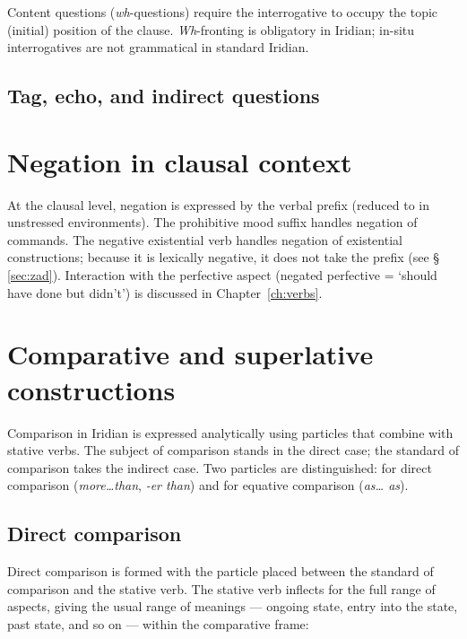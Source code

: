 Content questions (\textit{wh}-questions) require the interrogative to occupy the topic (initial) position of the clause. \textit{Wh}-fronting is obligatory in Iridian; in-situ interrogatives are not grammatical in standard Iridian.


\subsection{Tag, echo, and indirect questions}


\section{Negation in clausal context}\label{sec:clausal-negation}

At the clausal level, negation is expressed by the verbal prefix  (reduced to  in unstressed environments). The prohibitive mood suffix  handles negation of commands. The negative existential verb  handles negation of existential constructions; because it is lexically negative, it does not take the prefix  (see §\,\ref{sec:zad}). Interaction with the perfective aspect (negated perfective = `should have done but didn't') is discussed in Chapter~\ref{ch:verbs}.


\section{Comparative and superlative constructions}\label{sec:comparison}

Comparison in Iridian is expressed analytically using particles that combine
with stative verbs. The subject of comparison stands in the direct case; the
standard of comparison takes the indirect case. Two particles are
distinguished:  for direct comparison (\textit{more\ldots than},
\textit{-er than}) and  for equative comparison (\textit{as\ldots
as}).

\subsection{Direct comparison}

Direct comparison is formed with the particle  placed between the
standard of comparison and the stative verb. The stative verb inflects for the
full range of aspects, giving the usual range of meanings --- ongoing state,
entry into the state, past state, and so on --- within the comparative frame:

